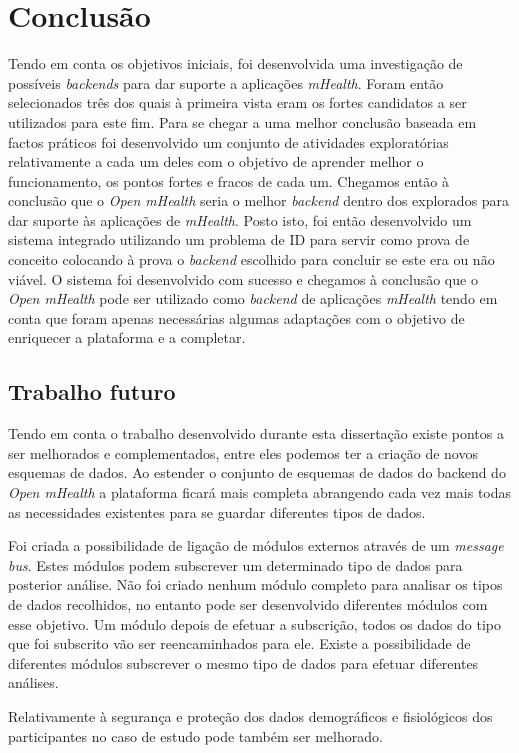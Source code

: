 \chapter{Conclusão}

Tendo em conta os objetivos iniciais, foi desenvolvida uma investigação de possíveis \textit{backends} para dar suporte a aplicações \textit{mHealth}. Foram então selecionados três dos quais à primeira vista eram os fortes candidatos a ser utilizados para este fim. Para se chegar a uma melhor conclusão baseada em factos práticos foi desenvolvido um conjunto de atividades exploratórias relativamente a cada um deles com o objetivo de aprender melhor o funcionamento, os pontos fortes e fracos de cada um. Chegamos então à conclusão que o \textit{Open mHealth} seria o melhor \textit{backend} dentro dos explorados para dar suporte às aplicações de \textit{mHealth}.
Posto isto, foi então desenvolvido um sistema integrado utilizando um problema de \gls{ID} para servir como prova de conceito colocando à prova o \textit{backend} escolhido para concluir se este era ou não viável.
O sistema foi desenvolvido com sucesso e chegamos à conclusão que o \textit{Open mHealth} pode ser utilizado como \textit{backend} de aplicações \textit{mHealth} tendo em conta que foram apenas necessárias algumas adaptações com o objetivo de enriquecer a plataforma e a completar.


\section{Trabalho futuro}
Tendo em conta o trabalho desenvolvido durante esta dissertação existe pontos a ser melhorados e complementados, entre eles podemos ter a criação de novos esquemas de dados. Ao estender o conjunto de esquemas de dados do backend do \textit{Open mHealth} a plataforma ficará mais completa abrangendo cada vez mais todas as necessidades existentes para se guardar diferentes tipos de dados.\par
Foi criada a possibilidade de ligação de módulos externos através de um \textit{message bus}. Estes módulos podem subscrever um determinado tipo de dados para posterior análise. Não foi criado nenhum módulo completo para analisar os tipos de dados recolhidos, no entanto pode ser desenvolvido diferentes módulos com esse objetivo. Um módulo depois de efetuar a subscrição, todos os dados do tipo que foi subscrito vão ser reencaminhados para ele. Existe a possibilidade de diferentes módulos subscrever o mesmo tipo de dados para efetuar diferentes análises.\par
Relativamente à segurança e proteção dos dados demográficos e fisiológicos dos participantes no caso de estudo pode também ser melhorado.

\cleardoublepage